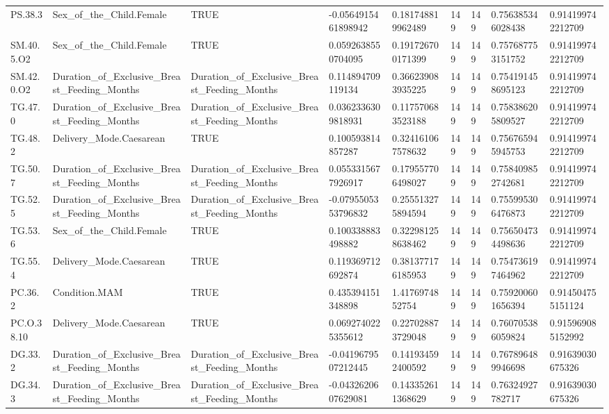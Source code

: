 \begin{longtable}{lllllllll}
PS.38.3 & Sex\_of\_the\_Child.Female & TRUE & -0.0564915461898942 & 0.181748819962489 & 149 & 149 & 0.756385346028438 & 0.914199742212709 \\
SM.40.5.O2 & Sex\_of\_the\_Child.Female & TRUE & 0.0592638550704095 & 0.191726700171399 & 149 & 149 & 0.757687753151752 & 0.914199742212709 \\
SM.42.0.O2 & Duration\_of\_Exclusive\_Breast\_Feeding\_Months & Duration\_of\_Exclusive\_Breast\_Feeding\_Months & 0.114894709119134 & 0.366239083935225 & 149 & 149 & 0.754191458695123 & 0.914199742212709 \\
TG.47.0 & Duration\_of\_Exclusive\_Breast\_Feeding\_Months & Duration\_of\_Exclusive\_Breast\_Feeding\_Months & 0.0362336309818931 & 0.117570683523188 & 149 & 149 & 0.758386205809527 & 0.914199742212709 \\
TG.48.2 & Delivery\_Mode.Caesarean & TRUE & 0.100593814857287 & 0.324161067578632 & 149 & 149 & 0.756765945945753 & 0.914199742212709 \\
TG.50.7 & Duration\_of\_Exclusive\_Breast\_Feeding\_Months & Duration\_of\_Exclusive\_Breast\_Feeding\_Months & 0.0553315677926917 & 0.179557706498027 & 149 & 149 & 0.758409852742681 & 0.914199742212709 \\
TG.52.5 & Duration\_of\_Exclusive\_Breast\_Feeding\_Months & Duration\_of\_Exclusive\_Breast\_Feeding\_Months & -0.0795505353796832 & 0.255513275894594 & 149 & 149 & 0.755995306476873 & 0.914199742212709 \\
TG.53.6 & Sex\_of\_the\_Child.Female & TRUE & 0.100338883498882 & 0.322981258638462 & 149 & 149 & 0.756504734498636 & 0.914199742212709 \\
TG.55.4 & Delivery\_Mode.Caesarean & TRUE & 0.119369712692874 & 0.381377176185953 & 149 & 149 & 0.754736197464962 & 0.914199742212709 \\
PC.36.2 & Condition.MAM & TRUE & 0.435394151348898 & 1.4176974852754 & 149 & 149 & 0.759200601656394 & 0.914504755151124 \\
PC.O.38.10 & Delivery\_Mode.Caesarean & TRUE & 0.0692740225355612 & 0.227028873729048 & 149 & 149 & 0.760705386059824 & 0.915969085152992 \\
DG.33.2 & Duration\_of\_Exclusive\_Breast\_Feeding\_Months & Duration\_of\_Exclusive\_Breast\_Feeding\_Months & -0.0419679507212445 & 0.141934592400592 & 149 & 149 & 0.767896489946698 & 0.91639030675326 \\
DG.34.3 & Duration\_of\_Exclusive\_Breast\_Feeding\_Months & Duration\_of\_Exclusive\_Breast\_Feeding\_Months & -0.0432620607629081 & 0.143352611368629 & 149 & 149 & 0.76324927782717 & 0.91639030675326 \\

\end{longtable}
